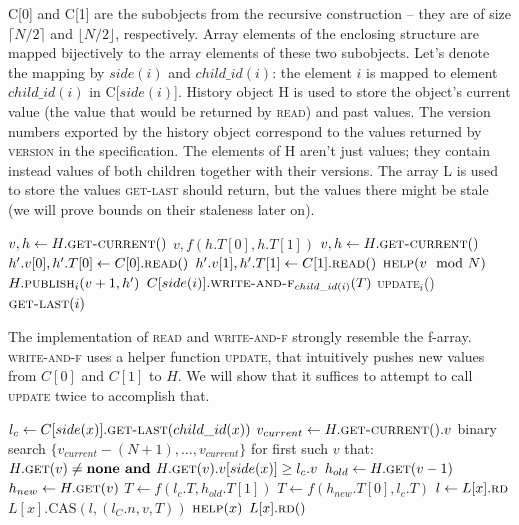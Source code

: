 \documentclass[a4paper,11pt]{article}
\def\none{\textbf{none} }
\newcommand{\fn}[1]{\textsc{#1}}
\begin{document}
C[0] and C[1] are the subobjects from the recursive construction -- they are of size $\lceil{}N/2\rceil{}$ and $\lfloor{}N/2\rfloor{}$, respectively. Array elements of the enclosing
structure are mapped bijectively to the array elements of these two subobjects. Let's denote the mapping by $side(i)$ and $child\_id(i)$: the element $i$ is mapped to element $child\_id(i)$ in C[$side(i)$].
History object H is used to store the object's current value (the value that would be returned by \fn{read}) and past values. The version numbers exported by the history object correspond to the values returned by \fn{version}
in the specification. The elements of H aren't just values; they contain instead values of both children together with their versions.
The array L is used to store the values \fn{get-last} should return, but the values there might be stale (we will prove bounds on their staleness later on).

\begin{algorithmic}[1]
		\State $v, h \gets H.\fn{get-current}()$ \label{get-getownver}
		\State \Return $v, f(h.T[0], h.T[1])$
	\EndFunction
		\State $v, h \gets H.\fn{get-current}()$ \label{upd-getown}
		\State $h'.v[0], h'.T[0] \gets C[0].\fn{read}()$ \label{upd-getch-0}
		\State $h'.v[1], h'.T[1] \gets C[1].\fn{read}()$ \label{upd-getch-1}
		\State $\fn{help}(v \mod N)$
		\State \Return $H.\fn{publish$_i$}(v+1, h')$ \label{upd-publish}
	\EndFunction
		\State $C[side(i)].\fn{write-and-f$_{child\_id(i)}$}(T)$ \label{upd-chupd}
		\If{\textbf{not} \fn{update$_i$}()} \label{updcall1}
		\State \fn{update$_i$}() \label{updcall2}
		\EndIf
		\State \Return $\fn{get-last}(i)$
	\EndFunction
\end{algorithmic}

The implementation of \fn{read} and \fn{write-and-f} strongly resemble the f-array. \fn{write-and-f} uses a helper function \fn{update}, that intuitively pushes new values from $C[0]$ and $C[1]$ to $H$.
We will show that it suffices to attempt to call \fn{update} twice to accomplish that.

\begin{algorithmic}[1]
		\State $l_c \gets C[side(x)].\fn{get-last}(child\_id(x))$ \label{get-last-recurse}
		\State $v_{current} \gets H.\fn{get-current}().v$
		\State binary search $\{v_{current}-(N+1),\ldots, v_{current}\}$ for first such $v$ that: \label{help-binsch}
		\Statex $H.\fn{get}(v) \neq \none \textbf{ and } H.\fn{get}(v).v[side(x)] \geq l_c.v$ %
			\State \Return
		\EndIf
		\State $h_{old} \gets H.\fn{get}(v-1)$ \label{help-getprev}
		\State $h_{new} \gets H.\fn{get}(v)$
		\If{$h_{old} = \none \textbf{ or } h_{new} = \none$}
			\State \Return
		\EndIf
			\State $T \gets f(l_c.T, h_{old}.T[1])$
		\Else
			\State $T \gets f(h_{new}.T[0], l_c.T)$
		\EndIf
		\State $l \gets L[x].\fn{rd}$
		 \label{upd-last-alreadydone}
			\State $L[x].\text{CAS}(l, (l_C.n, v, T))$
		\EndIf
	\EndFunction
		\State $\fn{help}(x)$
		\State \Return $L[x].\fn{rd}()$
	\EndFunction
\end{algorithmic}
\end{document}
